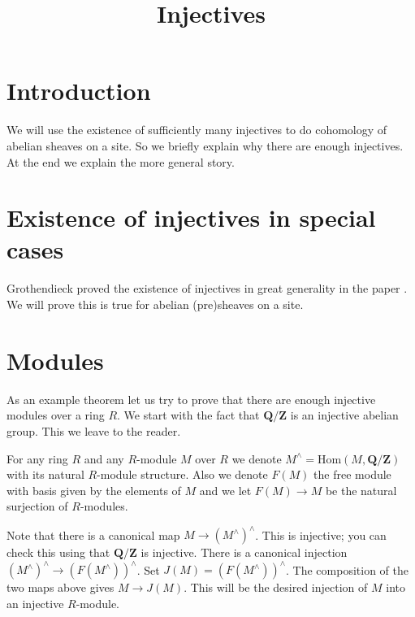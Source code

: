 

%


\title{Injectives}


\maketitle

\tableofcontents

\section{Introduction}
\label{section-introduction}

\noindent
We will use the existence of sufficiently many injectives to
do cohomology of abelian sheaves on a site. So we briefly 
explain why there are enough injectives. At the end we explain
the more general story.

\section{Existence of injectives in special cases}
\label{section-foundational}

\noindent
Grothendieck proved the existence of injectives in great generality 
in the paper \cite{Tohoku}. We will prove this is true for abelian
(pre)sheaves on a site.

\section{Modules}
\label{section-injectives-modules}

\noindent 
As an example theorem let us try to prove that there are enough injective
modules over a ring $R$. We start with the fact that $\mathbf{Q}/\mathbf{Z}$ 
is an injective abelian group. This we leave to the reader.

\smallskip\noindent
For any ring $R$ and any $R$-module $M$ over $R$ we denote 
$M^\wedge = \text{Hom}(M,\mathbf{Q}/\mathbf{Z})$
with its natural $R$-module structure. Also we denote
$F(M)$ the free module with basis given by the elements 
of $M$ and we let $F(M)\to M$ be the natural surjection of $R$-modules.

\smallskip\noindent
Note that there is a canonical map $M \to (M^\wedge)^\wedge$.
This is injective; you can check this using that 
$\mathbf{Q}/\mathbf{Z}$ is injective. There is a canonical 
injection $(M^\wedge)^\wedge \to (F(M^\wedge))^\wedge$.
Set $J(M)=(F(M^\wedge))^\wedge$. The composition of the two maps
above gives $M \to J(M)$. This will be the desired injection of $M$ 
into an injective $R$-module.

